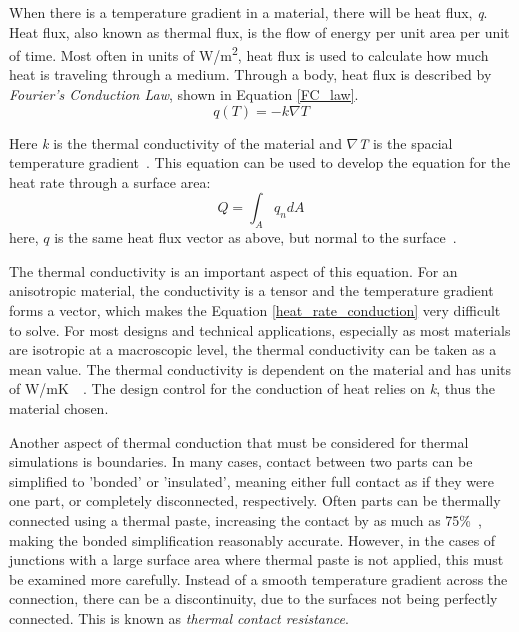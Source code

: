 When there is a temperature gradient in a material, there will be heat flux, \textit{q}. Heat flux, also known as thermal flux, is the flow of energy per unit area per unit of time. Most often in units of W/m\textsuperscript{2}, heat flux is used to calculate how much heat is traveling through a medium. Through a body, heat flux is described by \textit{Fourier’s Conduction Law}, shown in Equation \ref{FC_law}.
\begin{equation} \label{FC_law}
    q(T) = -k\nabla T
\end{equation}

Here \textit{k} is the thermal conductivity of the material and $\nabla$\textit{T} is the spacial temperature gradient~\citep{heat_transfer_textbook}. This equation can be used to develop the equation for the heat rate through a surface area:
\begin{equation} \label{heat_rate_conduction}
    Q = \int_{A}q_ndA
\end{equation}
here, $q$ is the same heat flux vector as above, but normal to the surface~\citep{Heat_Transfer_Basics}.

The thermal conductivity is an important aspect of this equation. For an anisotropic material, the conductivity is a tensor and the temperature gradient forms a vector, which makes the Equation \ref{heat_rate_conduction} very difficult to solve. For most designs and technical applications, especially as most materials are isotropic at a macroscopic level, the thermal conductivity can be taken as a mean value. The thermal conductivity is dependent on the material and has units of W/mK~\citep{heat_transfer_textbook}~\citep{FEA_SW}. The design control for the conduction of heat relies on \textit{k}, thus the material chosen. 

Another aspect of thermal conduction that must be considered for thermal simulations is boundaries. In many cases, contact between two parts can be simplified to 'bonded' or 'insulated', meaning either full contact as if they were one part, or completely disconnected, respectively. Often parts can be thermally connected using a thermal paste, increasing the contact by as much as 75\%~\citep{Heat_Transfer_Resistance}, making the bonded simplification reasonably accurate. However, in the cases of junctions with a large surface area where thermal paste is not applied, this must be examined more carefully. Instead of a smooth temperature gradient across the connection, there can be a discontinuity, due to the surfaces not being perfectly connected. This is known as \textit{thermal contact resistance}. 

